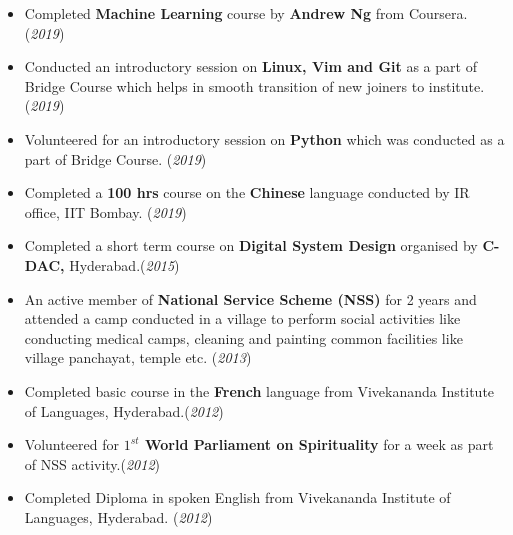 \documentclass[10pt]{article}
\begin{document}
\begin{itemize}
	\item {Completed \textbf{Machine Learning} course by \textbf{Andrew Ng} from Coursera. }\hfill{(\textit{2019})}
	\item {Conducted an introductory session on \textbf{Linux, Vim and Git} as a part of Bridge Course which helps in smooth transition of new joiners to institute. }\hfill{(\textit{2019})}
	\item {Volunteered for an introductory session on \textbf{Python} which was conducted as a part of Bridge Course.}
	\hfill{(\textit{2019})}
    \item {Completed a \textbf{100 hrs} course on the \textbf{Chinese} language conducted by IR office, IIT Bombay. }\hfill{(\textit{2019})}
    \item {Completed a short term course on \textbf{Digital System Design} organised by \textbf{C-DAC,} Hyderabad.}\hfill{(\textit{2015})}
	\item {An active member of \textbf{National Service Scheme (NSS)} for 2 years and attended a camp conducted in a village to perform social activities like conducting medical camps, cleaning and painting common facilities like village panchayat, temple etc.} \hfill{(\textit{2013})}
    \item {Completed basic course in the \textbf{French} language from Vivekananda Institute of Languages, Hyderabad.}\hfill{(\textit{2012})}
   	\item {Volunteered for \textbf{$1^{st}$ World Parliament on Spirituality} for a week as part of NSS activity.}\hfill{(\textit{2012})}
	\item {Completed Diploma in spoken English from Vivekananda Institute of Languages, Hyderabad.} \hfill{(\textit{2012})}
    
\end{itemize}

\end{document}
